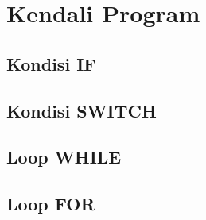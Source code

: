 \documentclass[12pt]{book}
\begin{document}
	\section{Kendali Program}
	
	\subsection{Kondisi IF}
	\subsection{Kondisi SWITCH}
	\subsection{Loop WHILE}
	\subsection{Loop FOR}	
\end{document}
